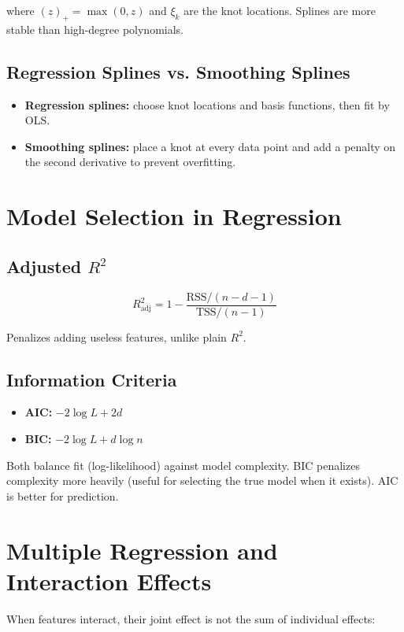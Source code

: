 where $(z)_+ = \max(0, z)$ and $\xi_k$ are the knot locations. Splines are more stable than high-degree polynomials.

\subsection{Regression Splines vs. Smoothing Splines}

\begin{itemize}
	\item \textbf{Regression splines:} choose knot locations and basis functions, then fit by OLS.
	\item \textbf{Smoothing splines:} place a knot at every data point and add a penalty on the second derivative to prevent overfitting.
\end{itemize}

\section{Model Selection in Regression}

\subsection{Adjusted $R^2$}

\[
	R^2_{\text{adj}} = 1 - \frac{\text{RSS} / (n - d - 1)}{\text{TSS} / (n - 1)}
\]

Penalizes adding useless features, unlike plain $R^2$.

\subsection{Information Criteria}

\begin{itemize}
	\item \textbf{AIC:} $-2 \log L + 2d$
	\item \textbf{BIC:} $-2 \log L + d \log n$
\end{itemize}

Both balance fit (log-likelihood) against model complexity. BIC penalizes complexity more heavily (useful for selecting the true model when it exists). AIC is better for prediction.

\section{Multiple Regression and Interaction Effects}

When features interact, their joint effect is not the sum of individual effects:

